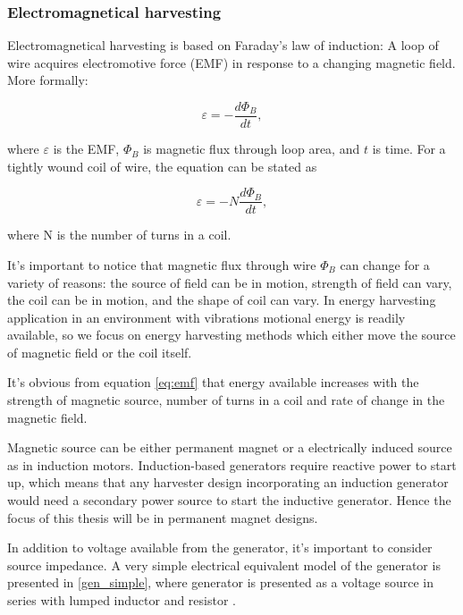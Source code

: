 \subsubsection{Electromagnetical harvesting}
Electromagnetical harvesting is based on Faraday's law of induction: A loop of wire acquires electromotive force (EMF) in response to a changing magnetic field. More formally:

\begin{equation}
  \varepsilon = - \frac{d \Phi_ {B}}{d t} , 
\end{equation}

where $\varepsilon$ is the EMF, $\Phi_{B}$ is magnetic flux through loop area, and $t$ is time. For a tightly wound coil of wire, the equation can be stated as 

\begin{equation} \label{eq:emf}
  \varepsilon = -N \frac{d \Phi_{B}}{d t} , 
\end{equation}

where N is the number of turns in a coil. \cite[p.999]{universityphysics}

It's important to notice that magnetic flux through wire $ \Phi_{B} $ can change for a variety of reasons: the source of field can be in motion, strength of field can vary, the coil can be in motion, and the shape of coil can vary. In energy harvesting application in an environment with vibrations motional energy is readily available, so we focus on energy harvesting methods which either move the source of magnetic field or the coil itself.

It's obvious from equation \eqref{eq:emf} that energy available increases with the strength of magnetic source, number of turns in a coil and rate of change in the magnetic field. 

Magnetic source can be either permanent magnet or a electrically induced source as in induction motors. Induction-based generators require reactive power to start up, which means that any harvester design incorporating an induction generator would need a secondary power source to start the inductive generator. Hence the focus of this thesis will be in permanent magnet designs.

In addition to voltage available from the generator, it's important to consider source impedance. A very simple electrical equivalent model of the generator is presented in \ref{gen_simple}, where generator is presented as a voltage source in series with lumped inductor and resistor \cite{Jirutitijaroen2012}. 

